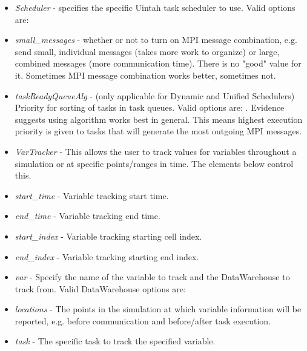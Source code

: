\begin{itemize}
  \item \emph{Scheduler} - specifies the specific Uintah task scheduler to
      use.
      Valid options are: 
  \item \emph{small\_messages} - whether or not to turn on MPI message
      combination, e.g. send small, individual messages (takes more work to
      organize) or large, combined messages (more communication time). There
      is no "good" value for it. Sometimes MPI message combination works
      better, sometimes not.
  \item \emph{taskReadyQueueAlg} - (only applicable for Dynamic and Unified
      Schedulers) Priority for sorting of tasks in task queues. Valid
      options
      are: . Evidence suggests using  algorithm works best
      in general. This means highest execution priority is given to tasks
      that will generate the most outgoing MPI messages.
  \item \emph{VarTracker} - This allows the user to track values for
      variables throughout a simulation or at specific points/ranges in
      time.
      The elements below control this.
  \item \emph{start\_time} - Variable tracking start time.
  \item \emph{end\_time} - Variable tracking end time.
  \item \emph{start\_index} - Variable tracking starting cell index.
  \item \emph{end\_index} - Variable tracking starting end index.
  \item \emph{var} - Specify the name of the variable to track and the
      DataWarehouse to track from. Valid DataWarehouse options are:
  \item \emph{locations} - The points in the simulation at which variable
      information will be reported, e.g. before communication and
      before/after task execution.
  \item \emph{task} - The specific task to track the specified variable.
\end{itemize}

